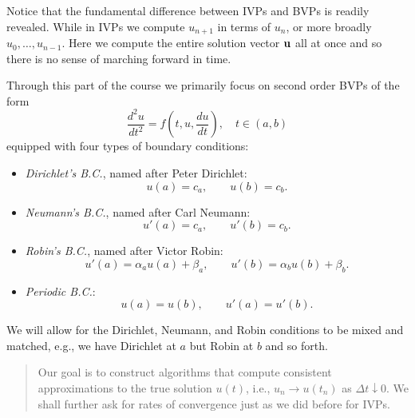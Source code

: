 Notice that the fundamental difference between IVPs and 
BVPs is readily revealed. While in IVPs we compute $u_{n+1}$ 
in terms of $u_n$, or more broadly $u_0, \dots, u_{n-1}$. 
Here we compute the entire solution vector $\mathbf{u}$ all at once
and so there is no sense of marching forward in time. 

Through this part of the course we primarily focus on 
second order BVPs of the form 
\begin{equation*}
    \frac{d^2 u}{dt^2} = f\left(t, u, \frac{d u}{dt} \right),
    \quad t \in (a, b)
\end{equation*}
equipped with four types of boundary conditions: 
\begin{itemize}
    \item {\it Dirichlet's B.C.}, named after Peter 
    Dirichlet:
    \begin{equation*}
        u(a) = c_a, \qquad u(b) = c_b.
    \end{equation*} 
    \item {\it Neumann's B.C.}, named after Carl Neumann: 
    \begin{equation*}
        u'(a) = c_a, \qquad u'(b) = c_b.
    \end{equation*}
    \item {\it Robin's B.C.}, named after Victor Robin:
    \begin{equation*}
        u'(a) = \alpha_a u(a) + \beta_a, \qquad 
        u'(b) = \alpha_b u(b) + \beta_b.
    \end{equation*}
    \item {\it Periodic B.C.}:
    \begin{equation*}
    u(a) = u(b), \qquad u'(a) = u'(b).     
    \end{equation*}
\end{itemize}
We will allow for the Dirichlet, Neumann, and Robin 
conditions to be mixed and matched, e.g., we have Dirichlet 
at $a$ but Robin at $b$ and so forth.

\begin{quote}
    Our goal is to construct algorithms that compute consistent 
    approximations to the true solution $u(t)$, i.e., 
    $u_n \to u(t_n)$ as $\Delta t \downarrow 0$. We shall 
    further ask for rates of convergence just as we did 
    before for IVPs.
\end{quote}

% 
% 